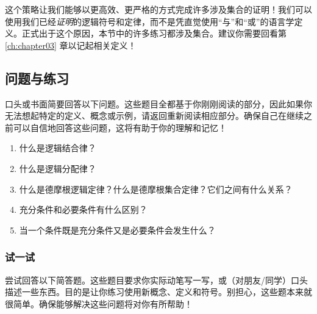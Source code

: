 这个策略让我们能够以更高效、更严格的方式完成许多涉及集合的证明！我们可以使用我们已经\emph{证明}的逻辑符号和定律，而不是凭直觉使用``与''和``或''的语言学定义。正式出于这个原因，本节中的许多练习都涉及集合。建议你需要回看第 \ref{ch:chapter03} 章以记起相关定义！

\subsection{问题与练习}

口头或书面简要回答以下问题。这些题目全都基于你刚刚阅读的部分，因此如果你无法想起特定的定义、概念或示例，请返回重新阅读相应部分。确保自己在继续之前可以自信地回答这些问题，这将有助于你的理解和记忆！

\begin{enumerate}[label=(\arabic*)]
    \item 什么是逻辑结合律？
    \item 什么是逻辑分配律？
    \item 什么是德摩根逻辑定律？什么是德摩根集合定律？它们之间有什么关系？
    \item 充分条件和必要条件有什么区别？
    \item 当一个条件既是充分条件又是必要条件会发生什么？
\end{enumerate}

\subsubsection*{试一试}

尝试回答以下简答题。这些题目要求你实际动笔写一写，或（对朋友/同学）口头描述一些东西。目的是让你练习使用新概念、定义和符号。别担心，这些题本来就很简单。确保能够解决这些问题将对你有所帮助！

